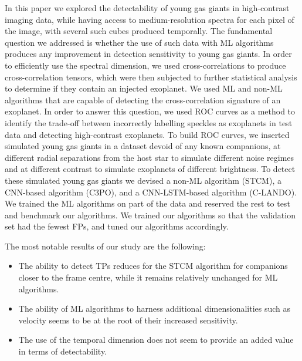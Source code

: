 \documentclass{aa}
\newcommand{\newchange}[1]{\textcolor{black}{#1}}
\begin{document}
In this paper we   explored the detectability of \newchange{young gas giant}s in high-contrast imaging data, while having access to medium-resolution spectra for each pixel of the image, with several such cubes produced temporally.
The fundamental question we   addressed is whether the use of such data with ML algorithms produces any improvement in detection sensitivity to \newchange{young gas giant}s.
In order to efficiently use the spectral dimension, we   used cross-correlations to produce cross-correlation tensors, which were then subjected to further statistical analysis to determine if they contain an injected exoplanet.
We   used ML and non-ML algorithms that are capable of detecting the cross-correlation signature of an exoplanet. %
In order to answer this question, we  used ROC curves as a method to identify the trade-off between incorrectly labelling speckles as exoplanets in test data and detecting high-contrast exoplanets.
To build ROC curves, we inserted simulated \newchange{young gas giant}s in a dataset devoid of any known companions, at different radial separations from the host star to simulate different noise regimes and at different contrast to simulate exoplanets of different brightness.
To detect these simulated \newchange{young gas giant}s we  devised a non-ML algorithm (STCM), a CNN-based algorithm (C3PO), and a CNN-LSTM-based algorithm (C-LANDO). 
We trained the ML algorithms on part of the data and reserved the rest to test and benchmark our algorithms. 
We trained our algorithms so that the validation set had the  fewest  FPs, and tuned our algorithms accordingly. 

The most notable results of our study are the following:
\begin{itemize}
    \item The ability to detect TPs reduces for the STCM algorithm for companions closer to the frame centre, while it remains relatively unchanged for ML algorithms.
    \item The ability of ML algorithms to harness additional dimensionalities such as velocity seems to be at the root of their increased sensitivity.
    \item The use of the temporal dimension does not seem to provide an added value in terms of detectability.%
\end{itemize}
\end{document}
